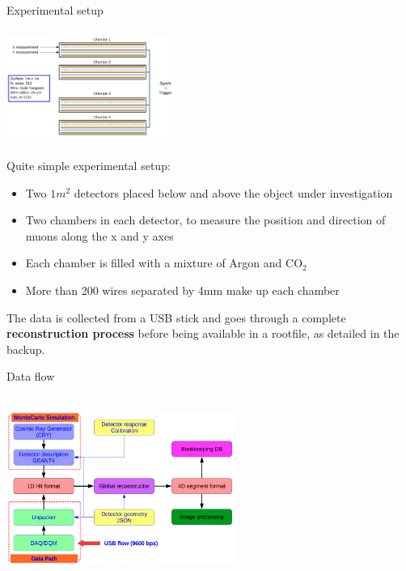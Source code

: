 \documentclass[handout,8 pt]{beamer}
\begin{document}
\begin{frame}{Experimental setup}
\justifying
\begin{minipage}[c]{.50\textwidth}
\includegraphics[width=5.5cm, height=3.7cm]{figs/muonChambers.png}
\end{minipage} \hfill
\begin{minipage}[c]{.49\textwidth}
\justifying
Quite simple experimental setup:
\begin{itemize}
\justifying
\item Two $1m^2$ detectors placed below and above the object under investigation
\item Two chambers in each detector, to measure the position and direction of muons along the x and y axes
\item Each chamber is filled with a mixture of Argon and CO$_2$
\item More than 200 wires separated by 4mm make up each chamber
\end{itemize}
\end{minipage} \hfill  \vfill

The data is collected from a USB stick and goes through a complete \textbf{\alert{reconstruction process}} before being available in a rootfile, as detailed in the backup. \vfill
\end{frame}

\begin{frame}{Data flow}
\begin{center}
\includegraphics[width=7.5cm, height=6cm]{figs/dataFlow.png}
\end{center}
\end{frame}
\end{document}
